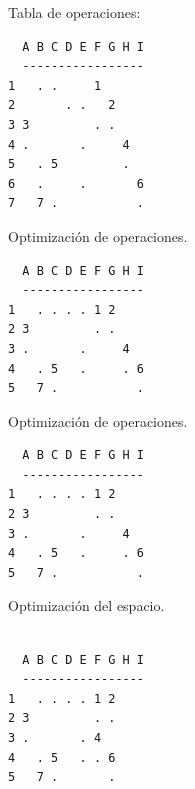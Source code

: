 \documentclass{beamer}
\begin{document}
\begin{frame}[fragile]
Tabla de operaciones:
\begin{lstlisting}
  A B C D E F G H I
  -----------------
1   . .     1      
2       . .   2        
3 3         . .        
4 .       .     4     
5   . 5         .
6   .     .       6
7   7 .           .
\end{lstlisting}
Optimización de operaciones.
\begin{lstlisting}
  A B C D E F G H I
  -----------------
1   . . . . 1 2    
2 3         . .       
3 .       .     4    
4   . 5   .     . 6
5   7 .           .
\end{lstlisting}
\end{frame}



\begin{frame}[fragile]
Optimización de operaciones.
\begin{lstlisting}
  A B C D E F G H I
  -----------------
1   . . . . 1 2    
2 3         . .       
3 .       .     4    
4   . 5   .     . 6
5   7 .           .
\end{lstlisting}
Optimización del espacio.
\begin{lstlisting}

  A B C D E F G H I
  -----------------
1   . . . . 1 2    
2 3         . .    
3 .       . 4      
4   . 5   . . 6    
5   7 .       .    
\end{lstlisting}
\end{frame}
\end{document}

